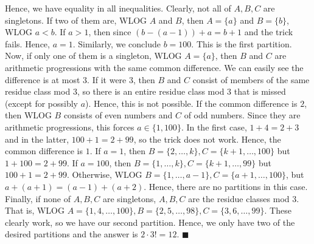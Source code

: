 \documentclass[14pt]{article}
\begin{document}
Hence, we have equality in all inequalities. Clearly, not all of $A,B,C$ are singletons. If two of them are, WLOG $A$ and $B$, then $A=\{a\}$ and $B=\{b\}$, WLOG $a<b$. If $a>1$, then since $(b-(a-1))+a=b+1$ and the trick fails. Hence, $a=1$. Similarly, we conclude $b=100$. This is the first partition. Now, if only one of them is a singleton, WLOG $A=\{a\}$, then $B$ and $C$ are arithmetic progressions with the same common difference. We can easily see the difference is at most $3$. If it were $3$, then $B$ and $C$ consist of members of the same residue class mod $3$, so there is an entire residue class mod $3$ that is missed (except for possibly $a$). Hence, this is not possible. If the common difference is $2$, then WLOG $B$ consists of even numbers and $C$ of odd numbers. Since they are arithmetic progressions, this forces $a\in\{1,100\}$. In the first case, $1+4=2+3$ and in the latter, $100+1=2+99$, so the trick does not work. Hence, the common difference is $1$. If $a=1$, then $B=\{2,\ldots,k\},C=\{k+1,\ldots,100\}$ but $1+100=2+99$. If $a=100$, then $B=\{1,\ldots,k\},C=\{k+1,\ldots,99\}$ but $100+1=2+99$. Otherwise, WLOG $B=\{1,\ldots,a-1\},C=\{a+1,\ldots,100\}$, but $a+(a+1)=(a-1)+(a+2)$. Hence, there are no partitions in this case. Finally, if none of $A,B,C$ are singletons, $A,B,C$ are the residue classes mod $3$. That is, WLOG $A=\{1,4,\ldots,100\},B=\{2,5,\ldots,98\},C=\{3,6,\ldots,99\}$. These clearly work, so we have our second partition. Hence, we only have two of the desired partitions and the answer is $2\cdot3!=12$. $\blacksquare$
	
\end{document}
